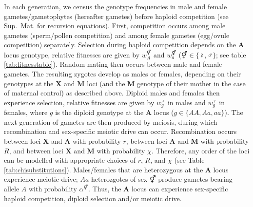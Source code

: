 \documentclass[12pt]{article}
\begin{document}
In each generation, we census the genotype frequencies in male and female gametes/gametophytes (hereafter gametes) before haploid competition (see Sup.\ Mat. for recursion equations). 
First, competition occurs among male gametes (sperm/pollen competition) and among female gametes (egg/ovule competition) separately. 
Selection during haploid competition depends on the \textbf{A} locus genotype, relative fitnesses are given by $w_A^\Hermaphrodite$ and $w_a^\Hermaphrodite$ ($\Hermaphrodite \in \{\female,\male\}$; see table \ref{tab:fitnesstable}). %
Random mating then occurs between male and female gametes.
The resulting zygotes develop as males or females, depending on their genotypes at the \textbf{X} and \textbf{M} loci (and the \textbf{M} genotype of their mother in the case of maternal control) as described above.
Diploid males and females then experience selection, relative fitnesses are given by $w_{g}^{\male}$ in males and $w_{g}^{\female}$ in females, where $g$ is the diploid genotype at the \textbf{A} locus ($g \in \{AA, Aa, aa\}$).  
The next generation of gametes are then produced by meiosis, during which recombination and sex-specific meiotic drive can occur. 
Recombination occurs between loci \textbf{X} and \textbf{A} with probability $r$, between loci \textbf{A} and \textbf{M} with probability $R$, and between loci \textbf{X} and \textbf{M} with probability $\chi$.
Therefore, any order of the loci can be modelled with appropriate choices of $r$, $R$, and $\chi$ (see Table \ref{tab:chisubstitutions}). 
Males/females that are heterozygous at the \textbf{A} locus experience meiotic drive; $Aa$ heterozgotes of sex $\Hermaphrodite$ produce gametes bearing allele $A$ with probability $\alpha^\Hermaphrodite$. 
Thus, the \textbf{A} locus can experience sex-specific haploid competition, diploid selection and/or meiotic drive. 
\end{document}
